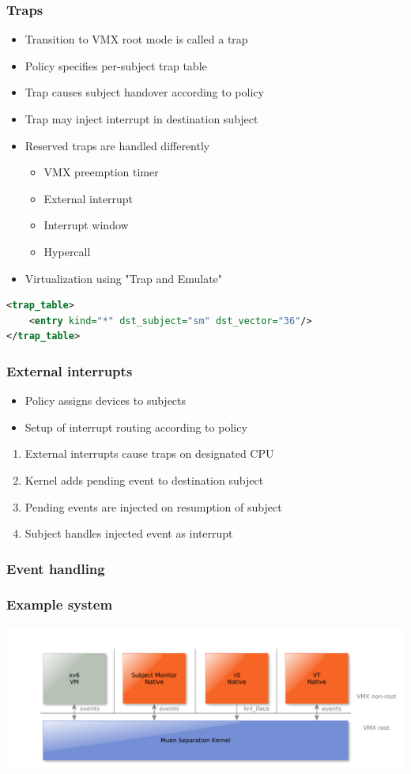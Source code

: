 \documentclass[xcolor={dvipsnames}]{beamer}
\begin{document}
\begin{frame}[fragile]\frametitle{Traps}
\begin{itemize}
	\item Transition to VMX root mode is called a trap
	\item Policy specifies per-subject trap table
	\item Trap causes subject handover according to policy
	\item Trap may inject interrupt in destination subject
	\item Reserved traps are handled differently
		\begin{itemize}
			\item VMX preemption timer
			\item External interrupt
			\item Interrupt window
			\item Hypercall
		\end{itemize}
	\item Virtualization using "Trap and Emulate"
\end{itemize}
\begin{lstlisting}[language=xml]
<trap_table>
    <entry kind="*" dst_subject="sm" dst_vector="36"/>
</trap_table>
\end{lstlisting}
\end{frame}

\begin{frame}\frametitle{External interrupts}
\begin{itemize}
	\item Policy assigns devices to subjects
	\item Setup of interrupt routing according to policy
\end{itemize}
\begin{enumerate}
	\item External interrupts cause traps on designated CPU
	\item Kernel adds pending event to destination subject
	\item Pending events are injected on resumption of subject
	\item Subject handles injected event as interrupt
\end{enumerate}
\end{frame}

\begin{frame}\frametitle{Event handling}
\end{frame}

\begin{frame}\frametitle{Example system}
\begin{center}
	\includegraphics[width=\textwidth]{images/architecture-example_system.pdf}
\end{center}
\end{frame}
\end{document}

